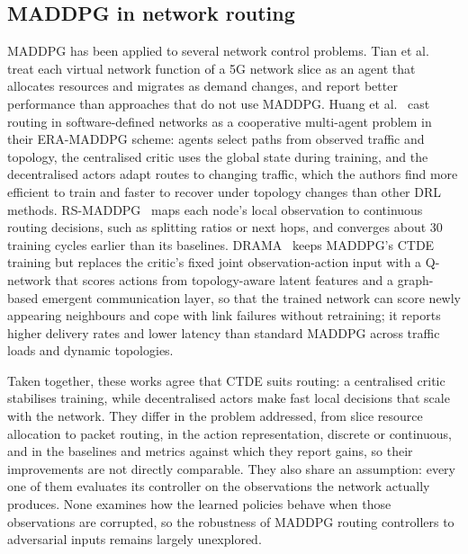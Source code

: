 \subsection{MADDPG in network routing}
\label{subsec:lit_maddpg_routing}

MADDPG has been applied to several network control problems. Tian et
al.~\cite{Tian2023maddpgslice} treat each virtual network function of a 5G network slice
as an agent that allocates resources and migrates as demand changes, and report better
performance than approaches that do not use MADDPG. Huang et al.~\cite{huang2025era}
cast routing in software-defined networks as a cooperative multi-agent problem in their
ERA-MADDPG scheme: agents select paths from observed traffic and topology, the
centralised critic uses the global state during training, and the decentralised actors
adapt routes to changing traffic, which the authors find more efficient to train and
faster to recover under topology changes than other DRL methods. RS-MADDPG~\cite{kuang2025rs}
maps each node's local observation to continuous routing decisions, such as splitting
ratios or next hops, and converges about 30 training cycles earlier than its baselines.
DRAMA~\cite{zhang2025dramadynamicpacketrouting} keeps MADDPG's CTDE training but
replaces the critic's fixed joint observation-action input with a Q-network that scores
actions from topology-aware latent features and a graph-based emergent communication
layer, so that the trained network can score newly appearing neighbours and cope with
link failures without retraining; it reports higher delivery rates and lower latency
than standard MADDPG across traffic loads and dynamic topologies.

Taken together, these works agree that CTDE suits routing: a centralised critic
stabilises training, while decentralised actors make fast local decisions that scale
with the network. They differ in the problem addressed, from slice resource allocation to
packet routing, in the action representation, discrete or continuous, and in the
baselines and metrics against which they report gains, so their improvements are not
directly comparable. They also share an assumption: every one of them evaluates its
controller on the observations the network actually produces. None examines how the
learned policies behave when those observations are corrupted, so the robustness of
MADDPG routing controllers to adversarial inputs remains largely unexplored.

